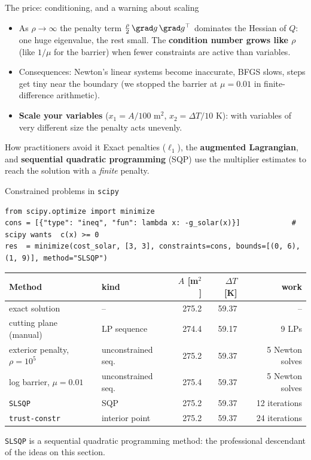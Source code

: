 \begin{frame}{The price: conditioning, and a warning about scaling}
  \begin{itemize}
    \item As $\rho\to\infty$ the penalty term $\frac\rho2\,\grad g\,\grad g^\top$ dominates the Hessian of $Q$: one huge eigenvalue, the rest small. The \textbf{condition number grows like $\rho$} (like $1/\mu$ for the barrier) when fewer constraints are active than variables.
    \item Consequences: Newton's linear systems become inaccurate, BFGS slows, steps get tiny near the boundary (we stopped the barrier at $\mu=0.01$ in finite-difference arithmetic).
    \item \textbf{Scale your variables} ($x_1=A/100$ m$^2$, $x_2=\Delta T/10$ K): with variables of very different size the penalty acts unevenly.
  \end{itemize}
  \begin{alertblock}{How practitioners avoid it}
    Exact penalties ($\ell_1$), the \textbf{augmented Lagrangian}, and \textbf{sequential quadratic programming} (SQP) use the multiplier estimates to reach the solution with a \emph{finite} penalty.
  \end{alertblock}
\end{frame}

\begin{frame}[fragile]{Constrained problems in \texttt{scipy}}
\begin{lstlisting}
from scipy.optimize import minimize
cons = [{"type": "ineq", "fun": lambda x: -g_solar(x)}]            # scipy wants  c(x) >= 0
res  = minimize(cost_solar, [3, 3], constraints=cons, bounds=[(0, 6), (1, 9)], method="SLSQP")
\end{lstlisting}
  \small
  \begin{center}
  \begin{tabular}{llrrr}
    \toprule
    Method & kind & $A$ [m$^2$] & $\Delta T$ [K] & work\\
    \midrule
    exact solution & -- & 275.2 & 59.37 & --\\
    cutting plane (manual) & LP sequence & 274.4 & 59.17 & 9 LPs\\
    exterior penalty, $\rho=10^5$ & unconstrained seq. & 275.2 & 59.37 & 5 Newton solves\\
    log barrier, $\mu=0.01$ & unconstrained seq. & 275.4 & 59.37 & 5 Newton solves\\
    \texttt{SLSQP} & SQP & 275.2 & 59.37 & 12 iterations\\
    \texttt{trust-constr} & interior point & 275.2 & 59.37 & 24 iterations\\
    \bottomrule
  \end{tabular}
  \end{center}
  \texttt{SLSQP} is a sequential quadratic programming method: the professional descendant of the ideas on this section.
\end{frame}
